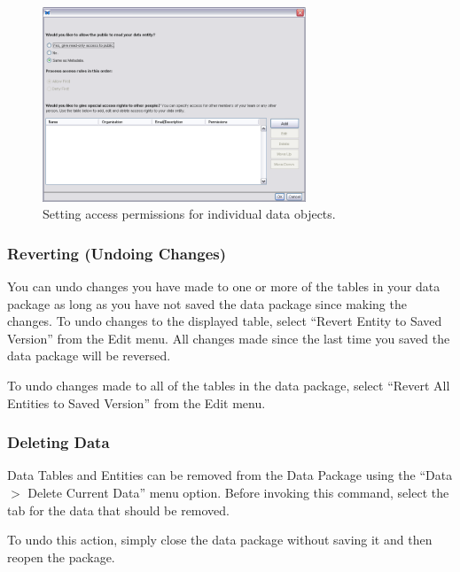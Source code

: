 \begin{figure}
  \centering
    \includegraphics[width=0.7\textwidth]{images/dialog-access-table.png}
  \caption{Setting access permissions for individual data objects.}
  \label{fig:dialog-access-table}
\end{figure}

\subsubsection{Reverting (Undoing Changes)}
\label{sec:edit-table-revert}

You can undo changes you have made to one or more of the tables in your
data package as long as you have not saved the data package since making
the changes. To undo changes to the displayed table, select ``Revert
Entity to Saved Version'' from the Edit menu. All changes made since the
last time you saved the data package will be reversed. 

To undo changes made to all of the tables in the data package, select
``Revert All Entities to Saved Version'' from the Edit menu.

\subsubsection{Deleting Data}
\label{sec:deleting-current-data}

Data Tables and Entities can be removed from the Data Package 
using the ``Data $>$ Delete Current Data'' menu option. Before invoking 
this command, select the tab for the data that should be removed.

To undo this action, simply close the data package without saving it 
and then reopen the package.
